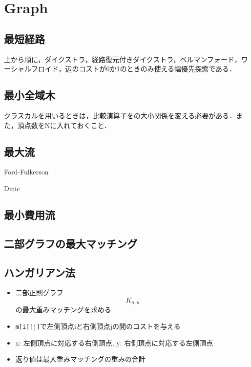 \section{Graph}

\subsection{最短経路}
上から順に，ダイクストラ，経路復元付きダイクストラ，ベルマンフォード，ワーシャルフロイド，辺のコストが0か1のときのみ使える幅優先探索である．


\subsection{最小全域木}
クラスカルを用いるときは，比較演算子をの大小関係を変える必要がある．また，頂点数をNに入れておくこと．


\subsection{最大流}
Ford-Fulkerson

Dinic


\subsection{最小費用流}


\subsection{二部グラフの最大マッチング}



\subsection{ハンガリアン法}
\begin{itemize}
  \item 二部正則グラフ$$K_{n,n}$$の最大重みマッチングを求める
  \item \verb#m[i][j]#で左側頂点iと右側頂点jの間のコストを与える
  \item x: 左側頂点に対応する右側頂点, y: 右側頂点に対応する左側頂点
  \item 返り値は最大重みマッチングの重みの合計
\end{itemize}


